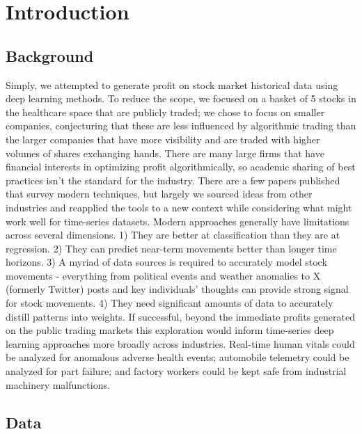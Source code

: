 \documentclass[10pt,twocolumn,letterpaper]{article}
\begin{document}
\section{Introduction}

\subsection{Background} 

Simply, we attempted to generate profit on stock market historical data using deep learning methods. To reduce the scope, we focused on a basket of 5 stocks in the healthcare space that are publicly traded; we chose to focus on smaller companies, conjecturing that these are less influenced by algorithmic trading than the larger companies that have more visibility and are traded with higher volumes of shares exchanging hands. 
There are many large firms that have financial interests in optimizing profit algorithmically, so academic sharing of best practices isn’t the standard for the industry. There are a few papers published that survey modern techniques, but largely we sourced ideas from other industries and reapplied the tools to a new context while considering what might work well for time-series datasets.
Modern approaches generally have limitations across several dimensions. 1) They are better at classification than they are at regression. 2) They can predict near-term movements better than longer time horizons. 3) A myriad of data sources is required to accurately model stock movements - everything from political events and weather anomalies to X (formerly Twitter) posts and key individuals’ thoughts can provide strong signal for stock movements. 4) They need significant amounts of data to accurately distill patterns into weights.
If successful, beyond the immediate profits generated on the public trading markets this exploration would inform time-series deep learning approaches more broadly across industries. Real-time human vitals could be analyzed for anomalous adverse health events; automobile telemetry could be analyzed for part failure; and factory workers could be kept safe from industrial machinery malfunctions.



\subsection{Data}
\end{document}
